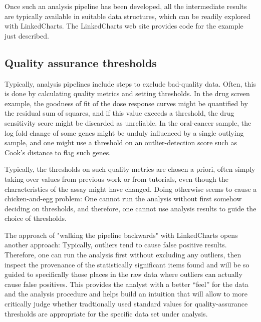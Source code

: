 \documentclass[twocolumn,10pt]{article}
\begin{document}
Once such an analysis pipeline has been developed, all the intermediate results are typically available in suitable data structures, which can be readily explored with LinkedCharts. The LinkedCharts web site provides code for the example just described.

\subsection{Quality assurance thresholds}

Typically, analysis pipelines include steps to exclude bad-quality data. Often, this is done by calculating quality metrics and setting thresholds. In the drug screen example, the goodness of fit of the dose response curves might be quantified by the residual sum of squares, and if this value exceeds a threshold, the drug sensitivity score might be discarded as unreliable. In the oral-cancer sample, the log fold change of some genes might be unduly influenced by a single outlying sample, and one might use a threshold on an outlier-detection score such as Cook's distance to flag such genes.

Typically, the thresholds on such quality metrics are chosen a priori, often simply taking over values from previous work or from tutorials, even though the characteristics of the assay might have changed. Doing otherwise seems to cause a chicken-and-egg problem: One cannot run the analysis without first somehow deciding on thresholds, and therefore, one cannot use analysis results to guide the choice of thresholds.

The approach of "walking the pipeline backwards" with LinkedCharts opens another approach: Typically, outliers tend to cause false positive results. Therefore, one can run the analysis first without excluding any outliers, then inspect the provenance of the statistically significant items found and will be so guided to specifically those places in the raw data where outliers can actually cause false positives. This provides the analyst with a better ``feel'' for the data and the analysis procedure and helps build an intuition that will allow to more critically judge whether tradtionally used standard values for quality-assurance thresholds are appropriate for the specific data set under analysis. 
\end{document}
